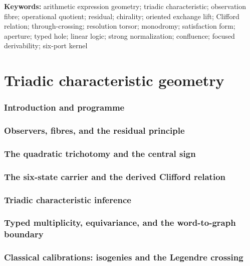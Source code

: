 \documentclass[11pt]{article}
\theoremstyle{definition}
\theoremstyle{remark}
\begin{document}
\noindent\textbf{Keywords:}
arithmetic expression geometry; triadic characteristic; observation fibre;
operational quotient; residual; chirality; oriented exchange lift; Clifford relation;
through-crossing; resolution torsor; monodromy; satisfaction form; aperture; typed
hole; linear logic; strong normalization; confluence; focused derivability; six-port
kernel

\setcounter{tocdepth}{2}
\tableofcontents
\newpage

\part{Triadic characteristic geometry}

\section{Introduction and programme}\label{sec:introduction}

\section{Observers, fibres, and the residual principle}\label{sec:observers}

\section{The quadratic trichotomy and the central sign}\label{sec:scalar-trichotomy}

\section{The six-state carrier and the derived Clifford relation}\label{sec:six-state}

\section{Triadic characteristic inference}\label{sec:triadic-inference}

\section{Typed multiplicity, equivariance, and the word-to-graph boundary}\label{sec:multiplicity}

\section{Classical calibrations: isogenies and the Legendre crossing}\label{sec:classical}

\end{document}
